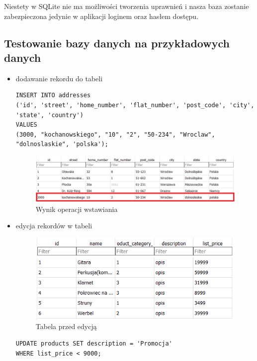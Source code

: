Niestety w SQLite nie ma możliwości tworzenia uprawnień i nasza baza zostanie zabezpieczona jedynie w aplikacji loginem oraz hasłem dostępu.

\subsection{Testowanie bazy danych na przykładowych danych}

\begin{itemize}
	
	\item dodawanie rekordu do tabeli
	
\begin{lstlisting}[style=SQLite]
INSERT INTO addresses
('id', 'street', 'home_number', 'flat_number', 'post_code', 'city', 'state', 'country')
VALUES
(3000, "kochanowskiego", "10", "2", "50-234", "Wroclaw", "dolnoslaskie", 'polska');
\end{lstlisting}

\begin{figure}[h]
	\centering
	\includegraphics[width=1\linewidth]{images/image12.png}
	\caption{Wynik operacji wstawiania}
	\label{image12}
\end{figure}
	
	\item edycja rekordów w tabeli
	
\begin{figure}[h]
	\centering
	\includegraphics[width=0.6\linewidth]{images/image13.png}
	\caption{Tabela przed edycją}
	\label{image13}
\end{figure}
	
\begin{lstlisting}[style=SQLite]
UPDATE products SET description = 'Promocja'
WHERE list_price < 9000;
\end{lstlisting}
	

\end{itemize}
